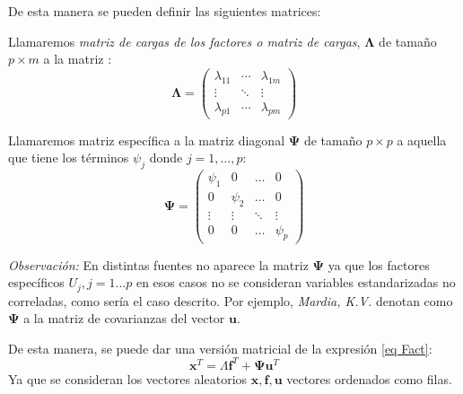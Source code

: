 \noindent De esta manera se pueden definir las siguientes matrices: 

\begin{defi}
Llamaremos \emph{matriz de cargas de los factores o matriz de cargas}, $\mathbf{\Lambda}$ de tamaño $p \times m$ a la matriz :
\begin{equation}
\mathbf{\Lambda}=\begin{pmatrix}
\lambda_{11} & \cdots & \lambda_{1 m}\\
\vdots & \ddots & \vdots\\
\lambda_{p1} & \cdots & \lambda_{pm}
\end{pmatrix}
\end{equation}
\end{defi}

\begin{defi}
Llamaremos matriz específica a la matriz diagonal $\mathbf{\Psi}$ de tamaño $p\times p$ a aquella que tiene los términos $\psi_j$ donde $j=1,\ldots , p$:
\begin{equation}
\mathbf{\Psi}=\begin{pmatrix}
    \psi_1 & 0 & \dots & 0 \\
    0 & \psi_2 & \dots & 0 \\
    \vdots & \vdots & \ddots & \vdots \\
    0 & 0 & \dots & \psi_p
\end{pmatrix}
\end{equation}
\end{defi}

\noindent \emph{Observación:} En distintas fuentes no aparece la matriz $\mathbf{\Psi}$ ya que los factores específicos $U_j, j=1\ldots p$ en esos casos no se consideran variables estandarizadas no correladas, como sería el caso descrito. Por ejemplo,  \emph{Mardia, K.V.} \cite{Mardia 1979} denotan como $\mathbf{\Psi}$ a la matriz de covarianzas del vector $\mathbf{u}$.

\noindent De esta manera, se puede dar una versión matricial de la expresión \ref{eq Fact}:
\begin{equation}
\mathbf{x}^T=\Lambda \mathbf{f}^T+ \mathbf{\Psi}\mathbf{u}^T
\end{equation}
Ya que se consideran los vectores aleatorios $\mathbf{x}, \mathbf{f}, \mathbf{u}$ vectores ordenados como filas. 

